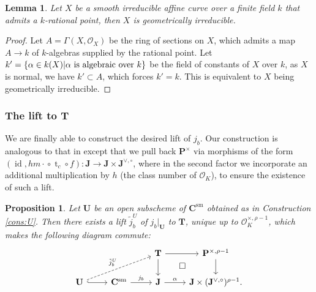 \documentclass[11pt,oneside]{amsart}
\theoremstyle{plain}
\newtheorem{proposition}[theorem]{Proposition}
\newtheorem{lemma}[theorem]{Lemma}
\theoremstyle{definition}
\DeclareMathOperator{\sm}{sm}
\DeclareMathOperator{\id}{id} \DeclareMathOperator{\Sel}{Sel}
\DeclareMathOperator{\tr}{t}
\def\TT{\mathbf{T}}
\def\J{\mathbf{J}}
\def\Jo{\mathbf{J}^{\vee,\circ}}
\def\P{\mathbf{P}}
\def\CC{\mathbf{C}}
\def\U{\mathbf{U}}
\def\oh{\mathcal{O}}
\begin{document}
\begin{lemma}
Let $X$ be a smooth irreducible affine curve over a finite field $k$ that admits a $k$-rational point, then $X$ is geometrically irreducible. 
\end{lemma}
 
 
\begin{proof} Let $A = \Gamma(X, \oh_X)$ be the ring of sections on $X$, which admits a map $A \rightarrow k$ of $k$-algebras supplied by the rational point. Let $k' = \{\alpha \in k(X) | \alpha \textup{ is algebraic over } k\}$ be the field of constants of $X$ over $k$, as $X$ is normal, we have $k' \subset A$, which forces $k' = k$. This is equivalent to $X$ being geometrically irreducible. 
\end{proof}


\subsubsection{The lift to $\TT$} 

We are finally able to construct the desired lift of $j_b$. Our construction is  analogous to that in \cite[\S 2]{EL19} except that we pull back $\P^{\times}$ via morphisms of the form $(\id, {hm\cdot}\circ \tr_c\circ f):\J\rightarrow \J\times \Jo$, where in the second factor we incorporate an additional multiplication by $h$ (the class number of $\oh_K$), to ensure the existence of such a lift.

\begin{proposition}\label{prop:Ulift}
Let $\U$ be an open subscheme of $\CC^{\sm}$ obtained as in Construction \ref{cons:U}. Then there exists a lift $\tilde{j}_b^U$ of $j_{b}\vert_{\U}$ to $\TT$, unique up to $\oh_K^{\times, \rho-1}$, which makes the following diagram commute:
\begin{equation}\label{diag:AJliftU}
\begin{tikzcd}[bend angle = 20]
  &
  & \TT  \arrow{r} \arrow{d} \arrow[phantom]{dr}{\square}
  & \P^{\times, \rho-1} \arrow{d} \\
  \U \arrow[hook]{r} \arrow[dashrightarrow]{rru}{\tilde{j}_{b}^U}
  & \CC^{\sm} \arrow{r}{j_b} 
  & \J \arrow{r}{\alpha}
  & \J\times (\Jo)^{\rho-1}.
\end{tikzcd}
\end{equation}
\end{proposition}
\end{document}
